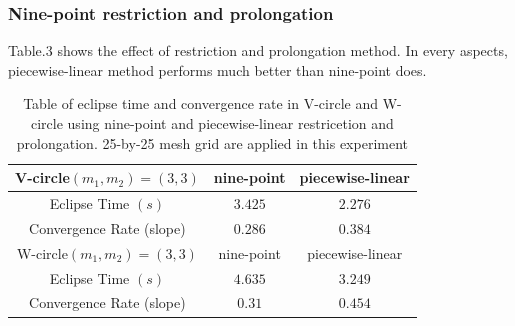 \documentclass[12pt]{article}
\begin{document}
\subsubsection{Nine-point restriction and prolongation}

Table.3 shows the effect of restriction and prolongation method. In every aspects, piecewise-linear method performs much better than nine-point does. 

\begin{table}[b!]
	\begin{center}
		\begin{tabular}{c|c|c}
			\hline
			V-circle$(m_1,m_2)=(3,3)$ &nine-point& piecewise-linear \\ 
			\hline
			Eclipse Time $(s)$ &$3.425$&$2.276$ \\
			\hline
			Convergence Rate (slope) & $0.286$& $0.384$\\
			\hline
			\hline
			W-circle$(m_1,m_2)=(3,3)$ &nine-point& piecewise-linear \\ 
			\hline
			Eclipse Time $(s)$ & $4.635$&$3.249$ \\
			\hline
			Convergence Rate (slope) & $0.31$& $0.454$\\
			\hline
		\end{tabular}
	\end{center}
	\caption{Table of eclipse time and convergence rate in V-circle and W-circle using nine-point and piecewise-linear restricetion and prolongation. 25-by-25 mesh grid are applied in this experiment}
\end{table}
\end{document}

